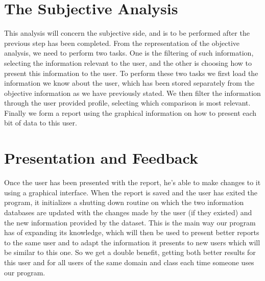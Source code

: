 \section{The Subjective Analysis}
\label{cap2:sec:subjective}

This analysis will concern the subjective side, and is to be performed after the previous step has been completed.
From the representation of the objective analysis, we need to perform two tasks.
One is the filtering of such information, selecting the information relevant to the user, and the other is choosing how to present this information to the user.
To perform these two tasks we first load the information we know about the user, which has been stored separately from the objective information as we have previously stated.
We then filter the information through the user provided profile, selecting which comparison is most relevant. Finally we form a report using the graphical information on how to present each bit of data to this user.

\section{Presentation and Feedback}
\label{cap2:sec:feedback}

Once the user has been presented with the report, he's able to make changes to it using a graphical interface. When the report is saved and the user has exited the program, it initializes a shutting down routine on which the two information databases are updated with the changes made by the user (if they existed) and the new information provided by the dataset.
This is the main way our program has of expanding its knowledge, which will then be used to present better reports to the same user and to adapt the information it presents to new users which will be similar to this one.
So we get a double benefit, getting both better results for this user and for all users of the same domain and class each time someone uses our program.



